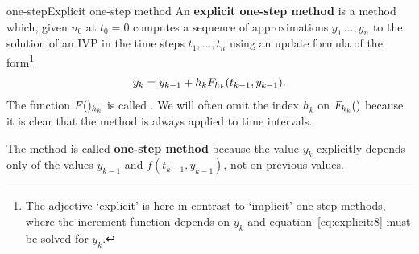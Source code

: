 \begin{Definition*}{one-step}{Explicit one-step method}
   An \textbf{explicit one-step
    method}  is a method which,
  given $u_0$ at $t_0 = 0$ computes a sequence of approximations
  $y_1\,\dots,y_n$ to the solution of an IVP in the time steps
  $t_1,\dots,t_n$ using an update formula of the form\footnote{The adjective
  `explicit' is here in contrast to `implicit'
  one-step methods, where the increment function depends 
	on $y_{k}$ and equation~\eqref{eq:explicit:8} must be solved
        for $y_{k}$.}
  \begin{gather}
    \label{eq:explicit:8}
    y_{k} = y_{k-1} + h_{k} F_{h_k}(t_{k-1},y_{k-1}).
  \end{gather}
  The function $F()_{h_k}$ is called .  We will often omit the index $h_k$ on
  $F_{h_k}()$ because it is clear that the method is always
  applied to time intervals.

  The method is called \textbf{one-step method}
  because the value $y_{k}$ explicitly depends only of the values
  $y_{k-1}$ and $f(t_{k-1}, y_{k-1})$, not on previous values.
\end{Definition*}

